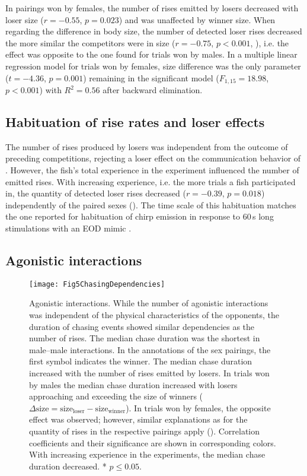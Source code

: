 In pairings won by females, the number of rises emitted by losers decreased with loser size ($r=-0.55$, $p=0.023$) and was unaffected by winner size. When regarding the difference in body size, the number of detected loser rises decreased the more similar the competitors were in size ($r=-0.75$, $p<0.001$, ), i.e. the effect was opposite to the one found for trials won by males. In a multiple linear regression model for trials won by females, size difference was the only parameter ($t=-4.36$, $p=0.001$) remaining in the significant model ($F_{1,15}=18.98$, $p<0.001$) with $R^2 = 0.56$ after backward elimination.

\subsection{Habituation of rise rates and loser effects}
The number of rises produced by losers was independent from the outcome of preceding competitions, rejecting a loser effect on the communication behavior of \lepto{}. However, the fish's total experience in the experiment influenced the number of emitted
rises. With increasing experience, i.e. the more trials a fish participated in, the quantity of detected loser rises decreased ($r=-0.39$, $p=0.018$) independently of the paired sexes (). The time scale of this habituation matches the one reported for habituation of chirp emission in response to 60\,s long stimulations with an EOD mimic \citep{Harvey2010}.

\subsection{Agonistic interactions}

\begin{figure}[tp]
  \centerline{\texttt{[image: Fig5ChasingDependencies]}}
  \caption{\label{agonistics} Agonistic interactions. While the number of agonistic interactions was independent of the physical characteristics of the opponents, the duration of chasing events showed similar dependencies as the number of rises.  The median chase duration was the shortest in male--male interactions. In the annotations of the sex pairings, the first symbol indicates the winner.  The median chase duration increased with the number of rises emitted by losers.  In trials won by males the median chase duration increased with losers approaching and exceeding the size of winners ($\Delta\text{size} = \text{size}_{\text{loser}} - \text{size}_{\text{winner}}$). In trials won by females, the opposite effect was observed; however, similar explanations as for the quantity of rises in the respective pairings apply (). Correlation coefficients and their significance are shown in corresponding colors.  With increasing experience in the experiments, the median chase duration decreased. * $p \leq 0.05$.}
\end{figure}

